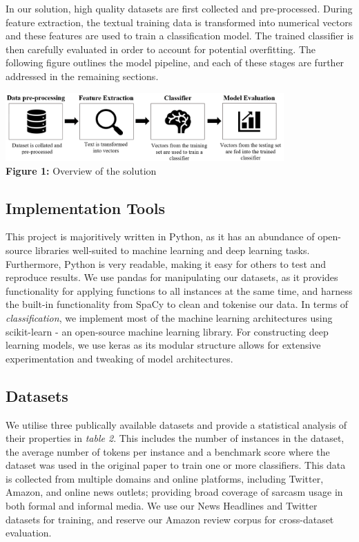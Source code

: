 \documentclass[12pt,a4paper]{article}
\begin{document}
In our solution, high quality datasets are first collected and pre-processed. During feature extraction, the textual training data is transformed into numerical vectors and these features are used to train a classification model. The trained classifier is then carefully evaluated in order to account for potential overfitting. The following figure outlines the model pipeline, and each of these stages are further addressed in the remaining sections.

\begin{center}
	\includegraphics[width=0.8\textwidth]{Images/modelpipeline2.png}
	\label{Model Pipeline}\\
	\textbf{Figure 1:} Overview of the solution
\end{center}

\subsection{Implementation Tools}\vspace{-4.2pt}
\noindent This project is majoritively written in Python, as it has an abundance of open-source libraries well-suited to machine learning and deep learning tasks. Furthermore, Python is very readable, making it easy for others to test and reproduce results. We use pandas for manipulating our datasets, as it provides functionality for applying functions to all instances at the same time, and harness the built-in functionality from SpaCy to clean and tokenise our data. In terms of \textit{classification}, we implement most of the machine learning architectures using scikit-learn - an open-source machine learning library. For constructing deep learning models, we use keras as its modular structure allows for extensive experimentation and tweaking of model architectures.

\subsection{Datasets}
\vspace{-4.2pt}\noindent We utilise three publically available datasets and provide a statistical analysis of their properties in \textit{table 2}. This includes the number of instances in the dataset, the average number of tokens per instance and a benchmark score where the dataset was used in the original paper to train one or more classifiers. This data is collected from multiple domains and online platforms, including Twitter, Amazon, and online news outlets; providing broad coverage of sarcasm usage in both formal and informal media. We use our News Headlines and Twitter datasets for training, and reserve our Amazon review corpus for cross-dataset evaluation.
\end{document}
